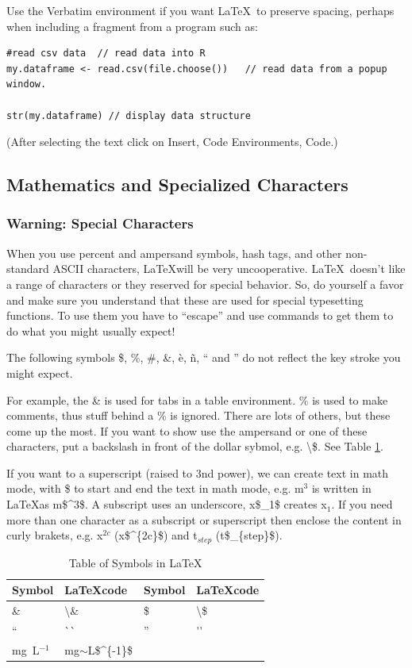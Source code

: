 \documentclass{book}\usepackage{knitr}
\begin{document}
Use the Verbatim environment if you want \LaTeX\ to preserve spacing, perhaps when
including a fragment from a program such as:
\begin{verbatim}
#read csv data  // read data into R
my.dataframe <- read.csv(file.choose())   // read data from a popup window.

str(my.dataframe) // display data structure

\end{verbatim}
(After selecting the text click on Insert, Code Environments, Code.)


\subsection*{Mathematics and Specialized Characters}\label{sub:mathchar}

\subsubsection*{Warning: Special Characters}

When you use percent and ampersand symbols, hash tags, and other non-standard ASCII characters, \LaTeX will be very uncooperative. \LaTeX~doesn't like a range of characters or they reserved for special behavior. So, do yourself a favor and make sure you understand that these are used for special typesetting functions. To use them you have to ``escape'' and use commands to get them to do what you might usually expect!  

The following symbols \$, \%, \#, \&, \`e, \~n, `` and '' do not reflect the key stroke you might expect. 

For example, the \& is used for tabs in a table environment. \% is used to make comments, thus stuff behind a \% is ignored. There are lots of others, but these come up the most. If you want to show use the ampersand or one of these characters, put a backslash in front of the dollar sybmol, e.g. \textbackslash\$. See Table \ref{tab:tableofsymbols}.

If you want to a superscript (raised to 3nd power), we can create text in math mode, with \$ to start and end the text in math mode, e.g. m$^3$ is written in \LaTeX as m\$\^{}3\$. A subscript uses an underscore, x\$\_1\$ creates x$_1$. If you need more than one character as a subscript or superscript then enclose the content in curly brakets, e.g. x$^{2c}$ (x\$\^{}\{2c\}\$) and t$_{step}$ (t\$\_\{step\}\$).

\begin{table}[h]
\caption{Table of Symbols in \LaTeX}
\label{tab:tableofsymbols}
\begin{tabular}{|ll|ll|} \hline
Symbol  & \LaTeX code & Symbol & \LaTeX code \\ \hline\hline
\&  & \textbackslash\&  & 
\$  & \textbackslash\$ \\
``  & \`{}\`{} & 
''  & \'{}\'{} \\
mg~L$^{-1}$ & mg$\sim${}L\$\^{}\{-1\}\$ & 
    & \\ 
\hline
\end{tabular}

\end{table}
\end{document}
